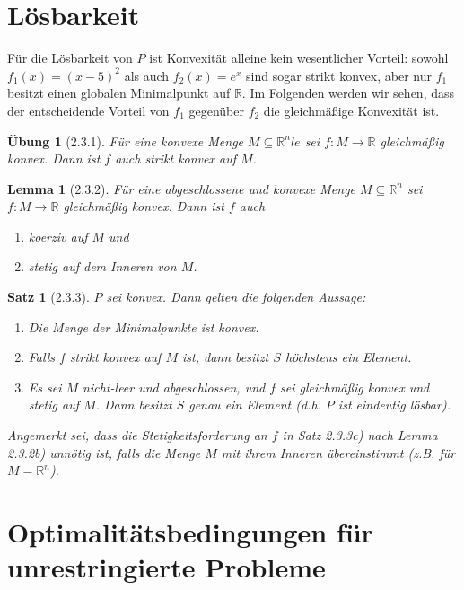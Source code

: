 \documentclass[12pt]{extreport} %
\newcommand{\R}{\mathbb{R}}
\theoremstyle{named}
\theoremstyle{nnamed}
\theoremstyle{itshape}
\newtheorem*{satz}{Satz}
\theoremstyle{normal}
\newtheorem*{lemma}{Lemma}
\newtheorem*{uebung}{Übung}
\begin{document}
\newpage

\section{Lösbarkeit}

Für die Lösbarkeit von $P$ ist Konvexität alleine kein wesentlicher Vorteil: sowohl $f_1(x) = (x - 5)^2$ als auch $f_2(x) = e^x$ sind sogar strikt konvex, aber nur $f_1$ besitzt einen globalen Minimalpunkt auf $\R$. Im Folgenden werden wir sehen, dass der entscheidende Vorteil von $f_1$ gegenüber $f_2$ die gleichmäßige Konvexität ist.

\begin{uebung}[2.3.1] %
	Für eine konvexe Menge $M \subseteq \R^nle$ sei $f \colon M \rightarrow \R$ gleichmäßig konvex. Dann ist $f$ auch strikt konvex auf $M$.	
\end{uebung}

\begin{lemma}[2.3.2]
	Für eine abgeschlossene und konvexe Menge $M \subseteq \R^n$ sei $f \colon M \rightarrow \R$ gleichmäßig konvex. Dann ist $f$ auch
	\begin{enumerate}
		\item koerziv auf $M$ und
		\item stetig auf dem Inneren von $M$.
	\end{enumerate}
\end{lemma}

\begin{satz}[2.3.3]
	$P$ sei konvex. Dann gelten die folgenden Aussage:
	\begin{enumerate}
		\item Die Menge der Minimalpunkte ist konvex.
		\item Falls $f$ strikt konvex auf $M$ ist, dann besitzt $S$ höchstens ein Element.
		\item Es sei $M$ nicht-leer und abgeschlossen, und $f$ sei gleichmäßig konvex und stetig auf $M$. Dann besitzt $S$ genau ein Element (d.h. $P$ ist eindeutig lösbar).
	\end{enumerate}	
	Angemerkt sei, dass die Stetigkeitsforderung an $f$ in Satz 2.3.3c) nach Lemma 2.3.2b) unnötig ist, falls die Menge $M$ mit ihrem Inneren übereinstimmt (z.B. für $M = \R^n$).
\end{satz}

\newpage

\section{Optimalitätsbedingungen für unrestringierte Probleme}
\end{document}
